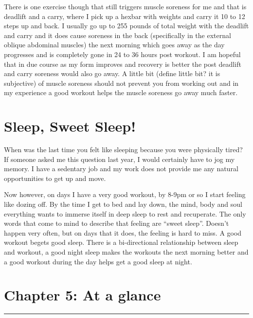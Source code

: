 \documentclass[
  oneside]{book}
\begin{document}
There is one exercise though that still triggers muscle soreness for me and that is deadlift and a carry, where I pick up a hexbar with weights and carry it 10 to 12 steps up and back. I usually go up to 255 pounds of total weight with the deadlift and carry and it does cause soreness in the back (specifically in the external oblique abdominal muscles) the next morning which goes away as the day progresses and is completely gone in 24 to 36 hours post workout. I am hopeful that in due course as my form improves and recovery is better the post deadlift and carry soreness would also go away. A little bit (define little bit? it is subjective) of muscle soreness should not prevent you from working out and in my experience a good workout helps the muscle soreness go away much faster.

\hypertarget{sleep-sweet-sleep}{%
\section{Sleep, Sweet Sleep!}\label{sleep-sweet-sleep}}

When was the last time you felt like sleeping because you were physically tired? If someone asked me this question last year, I would certainly have to jog my memory. I have a sedentary job and my work does not provide me any natural opportunities to get up and move.

Now however, on days I have a very good workout, by 8-9pm or so I start feeling like dozing off. By the time I get to bed and lay down, the mind, body and soul everything wants to immerse itself in deep sleep to rest and recuperate. The only words that come to mind to describe that feeling are ``sweet sleep''. Doesn't happen very often, but on days that it does, the feeling is hard to miss. A good workout begets good sleep. There is a bi-directional relationship between sleep and workout, a good night sleep makes the workouts the next morning better and a good workout during the day helps get a good sleep at night.

\hypertarget{chapter-5-at-a-glance}{%
\section{Chapter 5: At a glance}\label{chapter-5-at-a-glance}}

\begin{center}\rule{0.5\linewidth}{0.5pt}\end{center}
\end{document}
